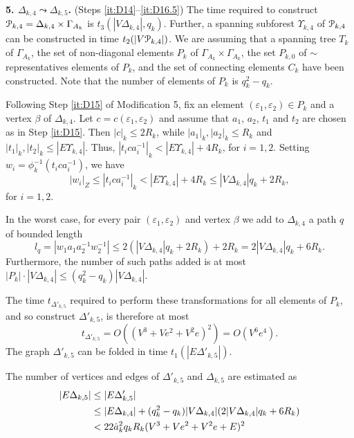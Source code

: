 \documentclass[a4paper,12pt]{article}
\renewcommand{\b}{\beta }
\newcommand{\G}{\Gamma }
\newcommand{\D}{\Delta }
\newcommand{\e}{\varepsilon }
\newcommand{\U}{\Upsilon }
\newcommand{\cP}{{\cal{P}}}
\numberwithin{equation}{section}
\numberwithin{figure}{section}
\begin{document}
{\bf 5. $\D_{k,4} \leadsto \D_{k,5}$.} (Steps \ref{it:D14}--\ref{it:D16.5}) The time required to construct
$\cP_{k,4}=\D_{k,4}\times \G_{A_k}$ is $t_3(|V \D_{k,4}|, q_k)$. Further,
 a spanning subforest $\U_{k,4}$ of $\cP_{k,4}$ can be constructed in time
$t_2(|V\cP_{k,4}|)$. We are assuming that  a spanning tree $T_k$ of
$\G_{A_k}$, the set of non-diagonal elements $P_k$ of
$\G_{A_k}\times \G_{A_k}$, the set $P_{k,0}$ of $\sim$ representatives
elements of $P_k$, and the set of connecting elements
 $C_k$ have been constructed. Note that the number of elements of $P_k$ is
$q_k^2-q_k$.



Following Step \ref{it:D15} of Modification 5, 
fix an element $(\e_1,\e_2)\in P_k$ and a vertex $\b$ of $\D_{k,4}$.
Let $c=c(\e_1,\e_2)$ and assume that $a_1$, $a_2$, $t_1$
and $t_2$  are chosen as in Step \ref{it:D15}. Then $|c|_k\le 2R_k$,
while $|a_1|_k, |a_2|_k\le R_k$ 
and $|t_1|_k,|t_2|_k \le |E\U_{k,4}|$. 
Thus, $|t_ica_i^{-1}|_k <  |E\U_{k,4}|+4R_k$, for
$i=1,2$. Setting $w_i=\phi^{-1}_k(t_ica_i^{-1})$, we have 
\[|w_i|_Z\le |t_ica_i^{-1}|_k <  |E\U_{k,4}|+4R_k\le |V\D_{k,4}|q_k+2R_k,\] for
$i=1,2$.

In the worst case, for every pair $(\e_1,\e_2) $ and vertex $\b$ we add
to $\D_{k,4}$ a path $q$ of bounded length \[l_q= |w_1 a_1a_2^{-1}
w_2^{-1}| \le 2( |V\D_{k,4}|q_k+2R_k  )+2 R_k
=2|V\D_{k,4}|q_k+6 R_k.\]
Furthermore, the number of such paths added is at most
$|P_k|\cdot|V\D_{k,4}|\le (q_k^2-q_k)|V\D_{k,4}|$. 

The time $t_{\D'_{k,5}}$ required to perform
these transformations for all elements of $P_k$, and
so construct $\D'_{k,5}$, is therefore at most
\begin{equation}\label{theta'5}
t_{\D'_{k,5}} = O((V^3+Ve^2+V^2e)^2)=O(V^6e^4).
\end{equation}
The graph $\D'_{k,5}$ can be folded in time $t_1(|E\D'_{k,5}|)$.

The number of vertices and edges of $\D'_{k,5}$ and $\D_{k,5}$ are estimated as
\begin{align}\label{etheta5}
|E\D_{k,5}| &\le |E\D'_{k,5}| \notag \\
&\le |E\D_{k,4}|+ 
(q_k^2-q_k)|V\D_{k,4}|(2|V\D_{k,4}|q_k+6 R_k)\notag \\
&<  22\hat a_k^2 q_kR_k(V^3+Ve^2+V^2e+E)^2
\end{align}
\end{document}
